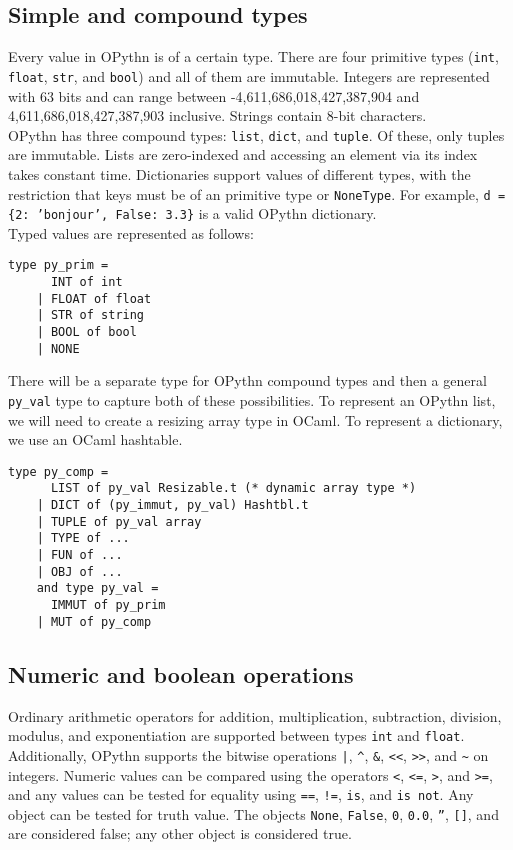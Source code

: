 \documentclass[11pt, twoside]{article}
\newcommand{\ms}{\texttt}
\begin{document}
    \subsection{Simple and compound types}
    Every value in OPythn is of a certain type. There are four primitive types (\ms{int}, \ms{float}, \ms{str}, and \ms{bool}) and all of them are immutable. Integers are represented with 63 bits and can range between -4,611,686,018,427,387,904 and 4,611,686,018,427,387,903 inclusive. Strings contain 8-bit characters.\\
    \indent OPythn has three compound types: \ms{list}, \ms{dict}, and \ms{tuple}. Of these, only tuples are immutable. Lists are zero-indexed and accessing an element via its index takes constant time. Dictionaries support values of different types, with the restriction that keys must be of an primitive type or \ms{NoneType}. For example, \ms{d = \{2: 'bonjour', False: 3.3\}} is a valid OPythn dictionary.\\
    \indent Typed values are represented as follows:
    \begin{lstlisting}[language=caml]
    type py_prim =
      INT of int
    | FLOAT of float
    | STR of string
    | BOOL of bool
    | NONE
    \end{lstlisting}
    There will be a separate type for OPythn compound types and then a general \ms{py\_val} type to capture both of these possibilities. To represent an OPythn list, we will need to create a resizing array type in OCaml. To represent a dictionary, we use an OCaml hashtable.
    \begin{lstlisting}[language=caml]
    type py_comp =
      LIST of py_val Resizable.t (* dynamic array type *)
    | DICT of (py_immut, py_val) Hashtbl.t
    | TUPLE of py_val array
    | TYPE of ...
    | FUN of ...
    | OBJ of ...
    and type py_val =
      IMMUT of py_prim
    | MUT of py_comp
    \end{lstlisting}

    \subsection{Numeric and boolean operations}
    Ordinary arithmetic operators for addition, multiplication, subtraction, division, modulus, and exponentiation are supported between types \ms{int} and \ms{float}. Additionally, OPythn supports the bitwise operations \ms{|}, \ms{\^}, \ms{\&}, \ms{<<}, \ms{>>}, and \ms{\~} on integers. Numeric values can be compared using the operators \ms{<}, \ms{<=}, \ms{>}, and \ms{>=}, and any values can be tested for equality using \ms{==}, \ms{!=}, \ms{is}, and \ms{is not}. Any object can be tested for truth value. The objects \ms{None}, \ms{False}, \ms{0}, \ms{0.0}, \ms{''}, \ms{[]}, and \ms{\string{\string}} are considered false; any other object is considered true.
\end{document}
